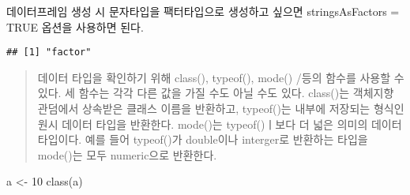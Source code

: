 \documentclass[
]{article}
\newenvironment{Shaded}{\begin{snugshade}}{\end{snugshade}}
\newcommand{\AttributeTok}[1]{\textcolor[rgb]{0.77,0.63,0.00}{#1}}
\newcommand{\ConstantTok}[1]{\textcolor[rgb]{0.00,0.00,0.00}{#1}}
\newcommand{\DecValTok}[1]{\textcolor[rgb]{0.00,0.00,0.81}{#1}}
\newcommand{\FunctionTok}[1]{\textcolor[rgb]{0.00,0.00,0.00}{#1}}
\newcommand{\NormalTok}[1]{#1}
\newcommand{\OtherTok}[1]{\textcolor[rgb]{0.56,0.35,0.01}{#1}}
\newcommand{\SpecialCharTok}[1]{\textcolor[rgb]{0.00,0.00,0.00}{#1}}
\newcommand{\StringTok}[1]{\textcolor[rgb]{0.31,0.60,0.02}{#1}}
\begin{document}
데이터프레임 생성 시 문자타입을 팩터타입으로 생성하고 싶으면
stringsAsFactors = TRUE 옵션을 사용하면 된다.

\begin{Shaded}
\end{Shaded}

\begin{verbatim}
## [1] "factor"
\end{verbatim}

\begin{quote}
데이터 타입을 확인하기 위해 class(), typeof(), mode() /등의 함수를
사용할 수 있다. 세 함수는 각각 다른 값을 가질 수도 아닐 수도 있다.
class()는 객체지향 관덤에서 상속받은 클래스 이름을 반환하고, typeof()는
내부에 저장되는 형식인 원시 데이터 타입을 반환한다. mode()는
typeof()ㅣ보다 더 넓은 의미의 데이터 타입이다. 예를 들어 typeof()가
double이나 interger로 반환하는 타입을 mode()는 모두 numeric으로
반환한다.
\end{quote}

\begin{Shaded}
\begin{Highlighting}[]
\NormalTok{a }\OtherTok{\textless{}{-}} \DecValTok{10}
\FunctionTok{class}\NormalTok{(a)}
\end{Highlighting}
\end{Shaded}
\end{document}
